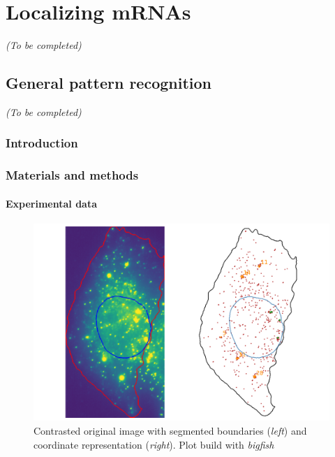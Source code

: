 
\graphicspath{{./figures/chapter5/}}

\chapter{Localizing mRNAs}
\label{ch:chapter5}

\minitoc
\newpage

\begin{center}
	\textit{(To be completed)}
\end{center}

\section{General pattern recognition}
\label{sec:general_pattern_recognition}

\begin{center}
	\textit{(To be completed)}
\end{center}

\subsection{Introduction}
\label{subsec:introduction_general_pattern}

\subsection{Materials and methods}
\label{subsec:materials_general_pattern}

\subsubsection{Experimental data}

\begin{figure}[h]
    \centering
    \includegraphics[width=\textwidth]{figures/chapter4/cell_extracted_0}
    \caption{Contrasted original image with segmented boundaries (\textit{left}) and coordinate representation (\textit{right}).
	Plot build with \emph{bigfish}}
    \label{fig:cell_extracted_0}
\end{figure}

